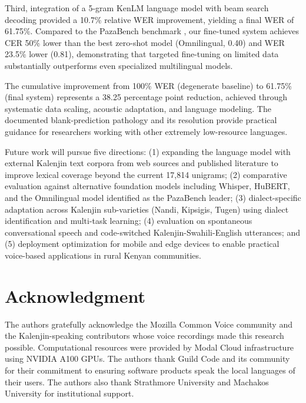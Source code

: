 \documentclass[conference]{IEEEtran}
\begin{document}
Third, integration of a 5-gram KenLM language model with beam search decoding provided a 10.7\% relative WER improvement, yielding a final WER of 61.75\%. Compared to the PazaBench benchmark \cite{b42}, our fine-tuned system achieves CER 50\% lower than the best zero-shot model (Omnilingual, 0.40) and WER 23.5\% lower (0.81), demonstrating that targeted fine-tuning on limited data substantially outperforms even specialized multilingual models.

The cumulative improvement from 100\% WER (degenerate baseline) to 61.75\% (final system) represents a 38.25 percentage point reduction, achieved through systematic data scaling, acoustic adaptation, and language modeling. The documented blank-prediction pathology and its resolution provide practical guidance for researchers working with other extremely low-resource languages.

Future work will pursue five directions: (1) expanding the language model with external Kalenjin text corpora from web sources and published literature to improve lexical coverage beyond the current 17,814 unigrams; (2) comparative evaluation against alternative foundation models including Whisper, HuBERT, and the Omnilingual model identified as the PazaBench leader; (3) dialect-specific adaptation across Kalenjin sub-varieties (Nandi, Kipsigis, Tugen) using dialect identification and multi-task learning; (4) evaluation on spontaneous conversational speech and code-switched Kalenjin-Swahili-English utterances; and (5) deployment optimization for mobile and edge devices to enable practical voice-based applications in rural Kenyan communities.

\section*{Acknowledgment}

The authors gratefully acknowledge the Mozilla Common Voice community and the Kalenjin-speaking contributors whose voice recordings made this research possible. Computational resources were provided by Modal Cloud infrastructure using NVIDIA A100 GPUs. The authors thank Guild Code and its community for their commitment to ensuring software products speak the local languages of their users. The authors also thank Strathmore University and Machakos University for institutional support.
\end{document}
